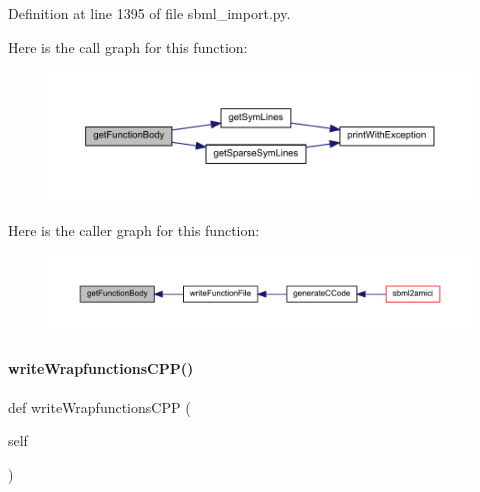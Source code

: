 Definition at line 1395 of file sbml\+\_\+import.\+py.

Here is the call graph for this function\+:
\nopagebreak
\begin{figure}[H]
\begin{center}
\leavevmode
\includegraphics[width=350pt]{classamici_1_1sbml__import_1_1_sbml_importer_a500fe2b103c67fe14f16d7076a114029_cgraph}
\end{center}
\end{figure}
Here is the caller graph for this function\+:
\nopagebreak
\begin{figure}[H]
\begin{center}
\leavevmode
\includegraphics[width=350pt]{classamici_1_1sbml__import_1_1_sbml_importer_a500fe2b103c67fe14f16d7076a114029_icgraph}
\end{center}
\end{figure}
\mbox{\label{classamici_1_1sbml__import_1_1_sbml_importer_a2ba24adc6b9fafdf99f5acd200acf17a}} 
\paragraph{\texorpdfstring{write\+Wrapfunctions\+C\+P\+P()}{writeWrapfunctionsCPP()}}
{\footnotesize\ttfamily def write\+Wrapfunctions\+C\+PP (\begin{DoxyParamCaption}\item[{}]{self }\end{DoxyParamCaption})}

